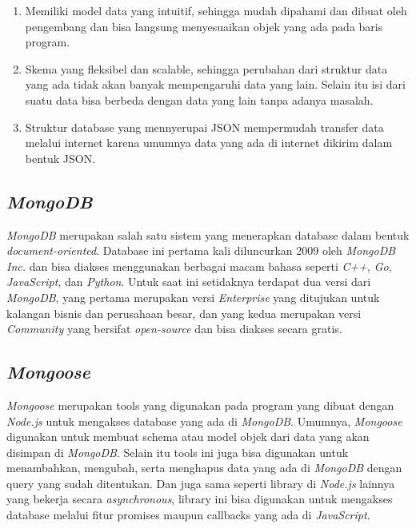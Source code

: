 \begin{enumerate}[nolistsep]

  \item Memiliki model data yang intuitif, sehingga mudah dipahami dan dibuat oleh pengembang dan bisa langsung menyesuaikan objek yang ada pada baris program.
  \vspace{0.5ex}

  \item Skema yang fleksibel dan scalable, sehingga perubahan dari struktur data yang ada tidak akan banyak mempengaruhi data yang lain.
  Selain itu isi dari suatu data bisa berbeda dengan data yang lain tanpa adanya masalah.
  \vspace{0.5ex}

  \item Struktur database yang mennyerupai JSON mempermudah transfer data melalui internet karena umumnya data yang ada di internet dikirim dalam bentuk JSON.
  \vspace{0.5ex}

\end{enumerate}
\vspace{0.5ex}

\subsection{\emph{MongoDB}}
\vspace{1ex}

\emph{MongoDB} merupakan salah satu sistem yang menerapkan database dalam bentuk \emph{document-oriented}.
Database ini pertama kali diluncurkan 2009 oleh \emph{MongoDB Inc.} dan bisa diakses menggunakan berbagai macam bahasa seperti \emph{C++}, \emph{Go}, \emph{JavaScript}, dan \emph{Python}.
Untuk saat ini setidaknya terdapat dua versi dari \emph{MongoDB}, yang pertama merupakan versi \emph{Enterprise} yang ditujukan untuk kalangan bisnis dan perusahaan besar, dan yang kedua merupakan versi \emph{Community} yang bersifat \emph{open-source} dan bisa diakses secara gratis.
\vspace{0.5ex}

\subsection{\emph{Mongoose}}
\vspace{1ex}

\emph{Mongoose} merupakan tools yang digunakan pada program yang dibuat dengan \emph{Node.js} untuk mengakses database yang ada di \emph{MongoDB}.
Umumnya, \emph{Mongoose} digunakan untuk membuat schema atau model objek dari data yang akan disimpan di \emph{MongoDB}.
Selain itu tools ini juga bisa digunakan untuk menambahkan, mengubah, serta menghapus data yang ada di \emph{MongoDB} dengan query yang sudah ditentukan.
Dan juga sama seperti library di \emph{Node.js} lainnya yang bekerja secara \emph{asynchronous}, library ini bisa digunakan untuk mengakses database melalui fitur promises maupun callbacks yang ada di \emph{JavaScript}.
\vspace{0.5ex}

